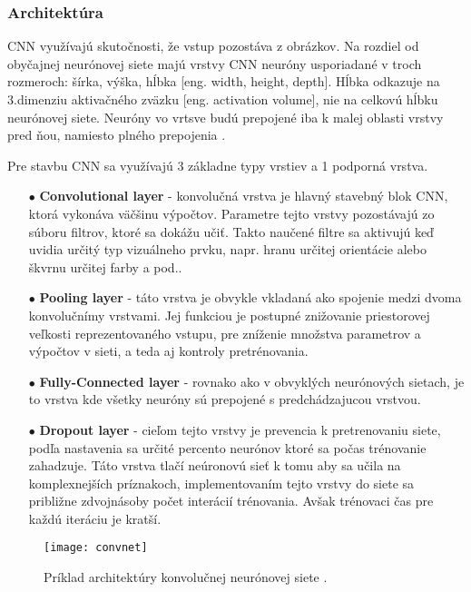 \subsubsection{Architektúra}
CNN využívajú skutočnosti, že vstup pozostáva z obrázkov.
Na rozdiel od obyčajnej neurónovej siete majú vrstvy CNN neuróny usporiadané v troch rozmeroch: šírka, výška, hĺbka [eng. width, height, depth].
Hĺbka odkazuje na 3.dimenziu aktivačného zväzku [eng. activation volume], nie na celkovú hĺbku neurónovej siete.
Neuróny vo vrtsve budú prepojené iba k malej oblasti vrstvy pred ňou, namiesto plného prepojenia \cite{odkaz:CNNArchitecture}.

Pre stavbu CNN sa využívajú 3 základne typy vrstiev a 1 podporná vrstva.
\begin{enumerate}
    \item[$\bullet$] \textbf{Convolutional layer} - konvolučná vrstva je hlavný stavebný blok CNN, ktorá vykonáva väčšinu výpočtov.
    Parametre tejto vrstvy pozostávajú zo súboru filtrov, ktoré sa dokážu učiť.
    Takto naučené filtre sa aktivujú keď uvidia určitý typ vizuálneho prvku, napr. hranu určitej orientácie alebo škvrnu určitej farby a pod..
    \item[$\bullet$] \textbf{Pooling layer} - táto vrstva je obvykle vkladaná ako spojenie medzi dvoma konvolučnímy vrstvami.
    Jej funkciou je postupné znižovanie priestorovej veľkosti reprezentovaného vstupu, pre zníženie množstva parametrov a výpočtov v sieti, a teda aj kontroly pretrénovania.
    \item[$\bullet$] \textbf{Fully-Connected layer} - rovnako ako v obvyklých neurónových sietach, je to vrstva kde všetky neuróny sú prepojené s predchádzajucou vrstvou.
    \item[$\bullet$] \textbf{Dropout layer} - cieľom tejto vrstvy je prevencia k pretrenovaniu siete, podľa nastavenia sa určité percento neurónov ktoré sa počas trénovanie zahadzuje.
    Táto vrstva tlačí neúronovú sieť k tomu aby sa učila na komplexnejších príznakoch, implementovaním tejto vrstvy do siete sa približne zdvojnásoby počet interácií trénovania.
    Avšak trénovaci čas pre každú iteráciu je kratší.
\end{enumerate}

\begin{figure}[H]
	\centering
	\texttt{[image: convnet]}
	\caption{Príklad architektúry konvolučnej neurónovej siete \cite{odkaz:CNNArchitecture}.}
	\label{pic:CNNExample}
\end{figure}

